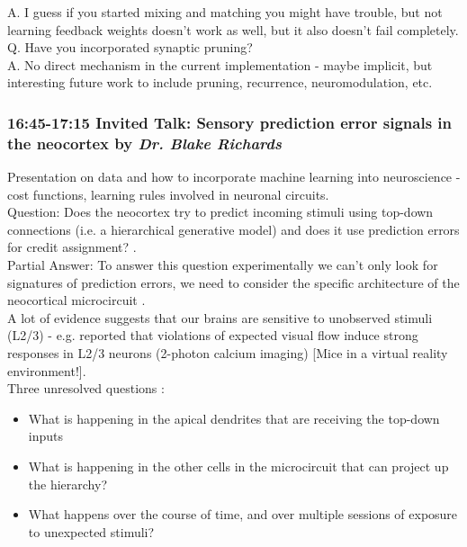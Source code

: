 \documentclass[12pt]{article}
\begin{document}
A. I guess if you started mixing and matching you might have trouble, but not learning feedback weights doesn't work as well, but it also doesn't fail completely. \\

Q. Have you incorporated synaptic pruning? \\

A. No direct mechanism in the current implementation - maybe implicit, but interesting future work to include pruning, recurrence, neuromodulation, etc. \\


\subsubsection{16:45-17:15 Invited Talk: Sensory prediction error signals in the neocortex by \textit{Dr. Blake Richards}}

Presentation on data and how to incorporate machine learning into neuroscience - cost functions, learning rules involved in neuronal circuits. \\

Question: Does the neocortex try to predict incoming stimuli using top-down connections (i.e. a hierarchical generative model) and does it use prediction errors for credit assignment? \cite{Lotter16}. \\

Partial Answer: To answer this question experimentally we can't only look for signatures of prediction errors, we need to consider the specific architecture of the neocortical microcircuit \cite{Harris13}. \\

A lot of evidence suggests that our brains are sensitive to unobserved stimuli (L2/3) - e.g. \cite{Zmarz16, Homann17} reported that violations of expected visual flow induce strong responses in L2/3 neurons (2-photon calcium imaging) [Mice in a virtual reality environment!]. \\

Three unresolved questions \cite{Harris13}:
\begin{itemize}
    \item What is happening in the apical dendrites that are receiving the top-down inputs
    \item What is happening in the other cells in the microcircuit that can project up the hierarchy?
    \item What happens over the course of time, and over multiple sessions of exposure to unexpected stimuli?
\end{itemize}
\end{document}
